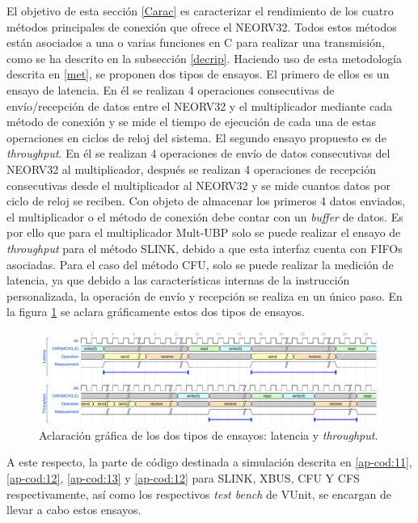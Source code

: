 El objetivo de esta sección \ref{Carac} es caracterizar el rendimiento de los cuatro métodos principales de conexión que ofrece el NEORV32.
Todos estos métodos están asociados a una o varias funciones en C para realizar una transmisión, como se ha descrito en la subsección \ref{decrip}.
Haciendo uso de esta metodología descrita en \ref{met}, se proponen dos tipos de ensayos.
El primero de ellos es un ensayo de latencia.
En él se realizan 4 operaciones consecutivas de envío/recepción de datos entre el NEORV32 y el multiplicador mediante cada método de conexión y se mide el tiempo de ejecución de cada una de estas operaciones en ciclos de reloj del sistema.
El segundo ensayo propuesto es de \textit{throughput}.
En él se realizan 4 operaciones de envío de datos consecutivas del NEORV32 al multiplicador, después se realizan 4 operaciones de recepción consecutivas desde el multiplicador al NEORV32 y se mide cuantos datos por ciclo de reloj se reciben.
Con objeto de almacenar los primeros 4 datos enviados, el multiplicador o el método de conexión debe contar con un \textit{buffer} de datos.
Es por ello que para el multiplicador Mult-UBP solo se puede realizar el ensayo de \textit{throughput} para el método SLINK, debido a que esta interfaz cuenta con FIFOs asociadas.
Para el caso del método CFU, solo se puede realizar la medición de latencia, ya que debido a las características internas de la instrucción personalizada, la operación de envío y recepción se realiza en un único paso.
En la figura \ref{fig:lat-thr} se aclara gráficamente estos dos tipos de ensayos.

\begin{figure}[h!]
    \centering
    \includegraphics[width=14cm]{Figuras/wave_process.pdf}
    \caption{Aclaración gráfica de los dos tipos de ensayos: latencia y \textit{throughput}.}
    \label{fig:lat-thr}
\end{figure}

A este respecto, la parte de código destinada a simulación descrita en \ref{ap-cod:11}, \ref{ap-cod:12}, \ref{ap-cod:13} y \ref{ap-cod:12} para SLINK, XBUS, CFU Y CFS respectivamente, así como los respectivos \textit{test bench} de VUnit, se encargan de llevar a cabo estos ensayos.

